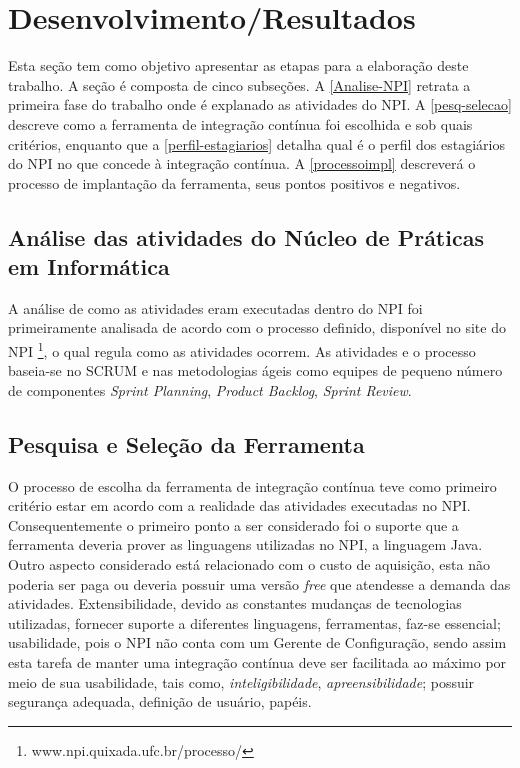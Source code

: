 \chapter{Desenvolvimento/Resultados}
Esta seção tem como objetivo apresentar as etapas para a elaboração deste trabalho. A seção é composta de cinco subseções. A \autoref{Analise-NPI} retrata a primeira fase do trabalho onde é explanado as atividades do NPI. A \autoref{pesq-selecao} descreve como a ferramenta de integração contínua foi escolhida e sob quais critérios, enquanto que a \autoref{perfil-estagiarios} detalha qual é o perfil dos estagiários do NPI no que concede à integração contínua. A \autoref{processoimpl} descreverá o processo de implantação da ferramenta, seus pontos positivos e negativos.


\section{Análise das atividades do Núcleo de Práticas em Informática}\label{Analise-NPI}
A análise de como as atividades eram executadas dentro do NPI foi primeiramente analisada de acordo com o processo definido, disponível no site do NPI \footnote{www.npi.quixada.ufc.br/processo/}, o qual regula como as atividades ocorrem. As atividades e o processo baseia-se no SCRUM e nas metodologias ágeis como equipes de pequeno número de componentes \textit{Sprint Planning}, \textit{Product Backlog}, \textit{Sprint Review}.



\section{Pesquisa e Seleção da Ferramenta}\label{pesq-selecao}
O processo de escolha da ferramenta de integração contínua teve como primeiro critério estar em acordo com a realidade das atividades executadas no NPI. Consequentemente o primeiro ponto a ser considerado foi o suporte que a ferramenta deveria prover as linguagens utilizadas no NPI, a linguagem Java. Outro aspecto considerado está relacionado com o custo de aquisição, esta não poderia ser paga ou deveria possuir uma versão \textit{free} que atendesse a demanda das atividades. Extensibilidade, devido as constantes mudanças de tecnologias utilizadas, fornecer suporte a diferentes linguagens, ferramentas, faz-se essencial; usabilidade, pois o NPI não conta com um Gerente de Configuração, sendo assim esta tarefa de manter uma integração contínua deve ser facilitada ao máximo por meio de sua usabilidade, tais como, \textit{inteligibilidade}, \textit{apreensibilidade}; possuir segurança adequada, definição de usuário, papéis.

